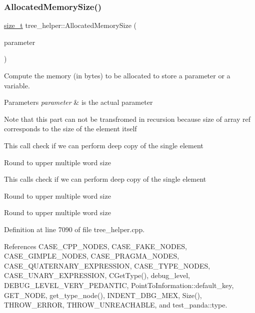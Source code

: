 \subsubsection{\texorpdfstring{Allocated\+Memory\+Size()}{AllocatedMemorySize()}}
{\footnotesize\ttfamily \hyperlink{tutorial__fpt__2017_2intro_2sixth_2test_8c_a7c94ea6f8948649f8d181ae55911eeaf}{size\+\_\+t} tree\+\_\+helper\+::\+Allocated\+Memory\+Size (\begin{DoxyParamCaption}\item[{const \hyperlink{tree__node_8hpp_a3cf5d02292c940f3892425a5b5fdec3c}{tree\+\_\+node\+Const\+Ref} \&}]{parameter }\end{DoxyParamCaption})\hspace{0.3cm}{\ttfamily [static]}}



Compute the memory (in bytes) to be allocated to store a parameter or a variable. 


\begin{DoxyParams}{Parameters}
{\em parameter} & is the actual parameter \\
\hline
\end{DoxyParams}
Note that this part can not be transfromed in recursion because size of array ref corresponds to the size of the element itself

This call check if we can perform deep copy of the single element

Round to upper multiple word size

This calls check if we can perform deep copy of the single element

Round to upper multiple word size

Round to upper multiple word size 

Definition at line 7090 of file tree\+\_\+helper.\+cpp.



References C\+A\+S\+E\+\_\+\+C\+P\+P\+\_\+\+N\+O\+D\+ES, C\+A\+S\+E\+\_\+\+F\+A\+K\+E\+\_\+\+N\+O\+D\+ES, C\+A\+S\+E\+\_\+\+G\+I\+M\+P\+L\+E\+\_\+\+N\+O\+D\+ES, C\+A\+S\+E\+\_\+\+P\+R\+A\+G\+M\+A\+\_\+\+N\+O\+D\+ES, C\+A\+S\+E\+\_\+\+Q\+U\+A\+T\+E\+R\+N\+A\+R\+Y\+\_\+\+E\+X\+P\+R\+E\+S\+S\+I\+ON, C\+A\+S\+E\+\_\+\+T\+Y\+P\+E\+\_\+\+N\+O\+D\+ES, C\+A\+S\+E\+\_\+\+U\+N\+A\+R\+Y\+\_\+\+E\+X\+P\+R\+E\+S\+S\+I\+ON, C\+Get\+Type(), debug\+\_\+level, D\+E\+B\+U\+G\+\_\+\+L\+E\+V\+E\+L\+\_\+\+V\+E\+R\+Y\+\_\+\+P\+E\+D\+A\+N\+T\+IC, Point\+To\+Information\+::default\+\_\+key, G\+E\+T\+\_\+\+N\+O\+DE, get\+\_\+type\+\_\+node(), I\+N\+D\+E\+N\+T\+\_\+\+D\+B\+G\+\_\+\+M\+EX, Size(), T\+H\+R\+O\+W\+\_\+\+E\+R\+R\+OR, T\+H\+R\+O\+W\+\_\+\+U\+N\+R\+E\+A\+C\+H\+A\+B\+LE, and test\+\_\+panda\+::type.

